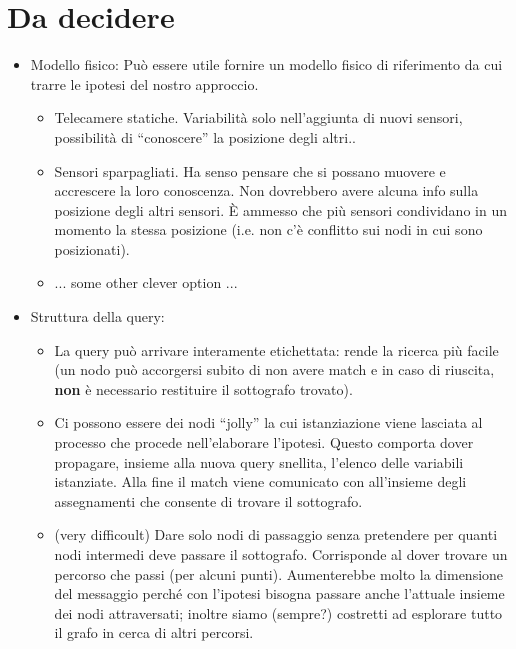 \documentclass{article}
\begin{document}
\section{Da decidere}
\label{sec:scelte}
\begin{itemize}
\item Modello fisico:
  Pu\`o essere utile fornire un modello fisico di riferimento da cui
  trarre le ipotesi del nostro approccio.
  \begin{itemize}
  \item Telecamere statiche. Variabilit\`a solo nell'aggiunta di nuovi
    sensori, possibilit\`a di ``conoscere'' la posizione degli altri..

  \item Sensori sparpagliati. Ha senso pensare che si possano muovere
    e accrescere la loro conoscenza. Non dovrebbero avere alcuna info
    sulla posizione degli altri sensori. \`E ammesso che pi\`u sensori
    condividano in un momento la stessa posizione (i.e. non c'\`e
    conflitto sui nodi in cui sono posizionati).
  \item ... some other clever option ...
  \end{itemize}
\item Struttura della query:
  \begin{itemize}
    \item La query pu\`o arrivare interamente etichettata: rende la ricerca
      pi\`u facile (un nodo pu\`o accorgersi subito di non avere match e
      in caso di riuscita, \textbf{non} \`e necessario restituire il
      sottografo trovato).
    \item Ci possono essere dei nodi ``jolly'' la cui
      istanziazione viene lasciata al processo che procede nell'elaborare
      l'ipotesi. Questo comporta dover propagare, insieme alla nuova query
      snellita, l'elenco delle variabili istanziate.
      Alla fine il match viene comunicato con all'insieme degli assegnamenti
      che consente di trovare il sottografo.

    \item (very difficoult) Dare solo nodi di passaggio senza pretendere
      per quanti nodi intermedi deve passare il sottografo. Corrisponde
      al dover trovare un percorso che passi (per alcuni punti).
      Aumenterebbe molto la dimensione del messaggio perch\'e con
      l'ipotesi bisogna passare anche l'attuale insieme dei nodi
      attraversati; inoltre siamo (sempre?) costretti ad esplorare
      tutto il grafo in cerca di altri percorsi.


\end{itemize}
\end{itemize}
\end{document}
